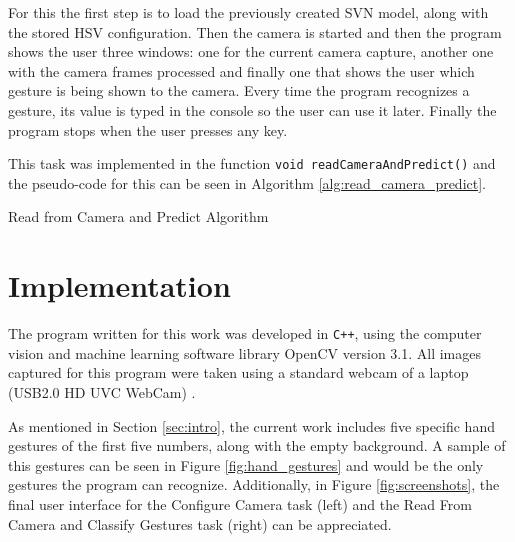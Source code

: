 \documentclass[a4paper,10pt,english]{article}
\begin{document}
         For this the first step is to load the previously created SVN model, along with the stored HSV configuration. Then the camera is started and then the program shows the user three windows: one for the current camera capture, another one with the camera frames processed and finally one that shows the user which gesture is being shown to the camera. Every time the program recognizes a gesture, its value is typed in the console so the user can use it later. Finally the program stops when the user presses any key.
         
         This task was implemented in the function \texttt{void readCameraAndPredict()} and the pseudo-code for this can be seen in Algorithm \ref{alg:read_camera_predict}.
         
         \begin{algorithm}[H]
             \BlankLine
            \caption{Read from Camera and Predict Algorithm} \label{alg:read_camera_predict}
        \end{algorithm}
    
    \section{Implementation}
         The program written for this work was developed in \texttt{C++}, using the computer vision and machine learning software library OpenCV \cite{OpenCV} version 3.1. All images captured for this program were taken using a standard webcam of a laptop (USB2.0 HD UVC WebCam) .
         
         As mentioned in Section \ref{sec:intro}, the current work includes five specific hand gestures of the first five numbers, along with the empty background. A sample of this gestures can be seen in Figure \ref{fig:hand_gestures} and would be the only gestures the program can recognize. Additionally, in Figure \ref{fig:screenshots}, the final user interface for the Configure Camera task (left) and the Read From Camera and Classify Gestures task (right) can be appreciated.
         
\end{document}
